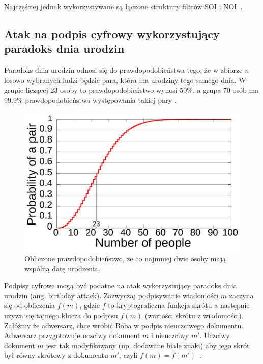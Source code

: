 \documentclass[wi]{zut}
\begin{document}
Najczęściej jednak wykorzystywane są łączone struktury filtrów SOI i NOI~\cite{Cariow_7}.


\subsection{Atak na podpis cyfrowy wykorzystujący paradoks dnia urodzin}

Paradoks dnia urodzin odnosi się do prawdopodobieństwa tego, że w zbiorze $n$ losowo wybranych ludzi będzie para, która ma urodziny tego samego dnia. W grupie liczącej 23 osoby to prawdopodobieństwo wynosi 50\%, a grupa 70 osób ma 99.9\% prawdopodobieństwa występowania takiej pary \cite{wiki:Birthday_problem}.


\begin{figure}[H]
    \centering
    \includegraphics[width=0.5\linewidth]{images/Birthday_Paradox.svg.png}
    \caption{Obliczone prawdopodobieństwo, ze co najmniej dwie osoby mają wspólną datę urodzenia.}
    \label{fig:birthdaj}
\end{figure}

Podpisy cyfrowe mogą być podatne na atak wykorzystujący paradoks dnia urodzin (ang. birthday attack). Zazwyczaj podpisywanie wiadomości $m$ zaczyna się od obliczenia $f(m)$, gdzie $f$ to kryptograficzna funkcja skrótu a następnie używa się tajnego klucza do podpisu $f(m)$ (wartości skrótu z wiadomości). Załóżmy że adwersarz, chce wrobić Boba w podpis nieuczciwego dokumentu. Adwersarz przygotowuje uczciwy dokument $m$ i nieuczciwy $m'$. Uczciwy dokument $m$ jest tak modyfikowany (np. dodawane białe znaki) aby jego skrót był równy skrótowy z dokumentu $m'$, czyli $f(m) = f(m')$~\cite{wiki:Birthday_problem}.
\end{document}
